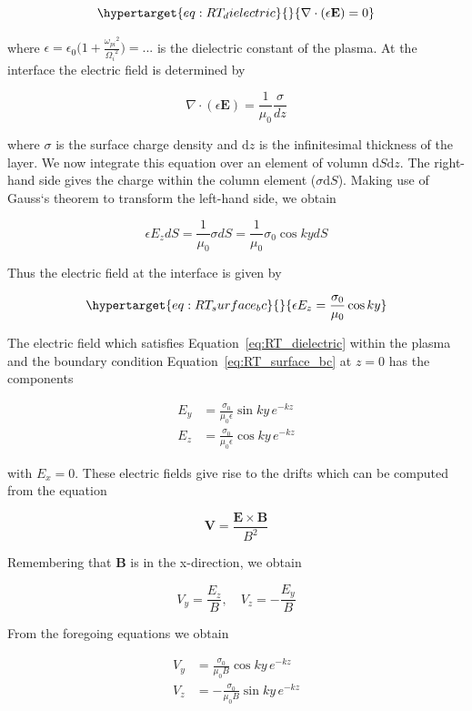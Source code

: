 \documentclass[
  notoc %
]{tufte-book}
\begin{document}
\begin{equation}\protect\hypertarget{eq:RT_dielectric}{}{
\nabla\cdot(\epsilon\mathbf{E})=0
}\label{eq:RT_dielectric}\end{equation}

where
\(\epsilon=\epsilon_0\big( 1+\frac{{\omega_{pi}}^2}{{\Omega_i}^2}\big)=...\)
is the dielectric constant of the plasma. At the interface the electric
field is determined by

\[
\nabla\cdot(\epsilon\mathbf{E})=\frac{1}{\mu_0}\frac{\sigma}{dz}
\]

where \(\sigma\) is the surface charge density and \(\mathrm{d}z\) is
the infinitesimal thickness of the layer. We now integrate this equation
over an element of volumn \(\mathrm{d}S\mathrm{d}z\). The right-hand
side gives the charge within the column element (\(\sigma\mathrm{d}S\)).
Making use of Gauss`s theorem to transform the left-hand side, we obtain

\[
\epsilon E_z dS = \frac{1}{\mu_0}\sigma dS = \frac{1}{\mu_0}\sigma_0 \cos ky dS
\]

Thus the electric field at the interface is given by

\begin{equation}\protect\hypertarget{eq:RT_surface_bc}{}{
\epsilon E_z = \frac{\sigma_0}{\mu_0}\cos ky
}\label{eq:RT_surface_bc}\end{equation}

The electric field which satisfies Equation~\ref{eq:RT_dielectric}
within the plasma and the boundary condition
Equation~\ref{eq:RT_surface_bc} at \(z=0\) has the components

\[
\begin{aligned}
E_y &= \frac{\sigma_0}{\mu_0\epsilon}\sin ky\, e^{-kz} \\
E_z &= \frac{\sigma_0}{\mu_0\epsilon}\cos ky\, e^{-kz}
\end{aligned}
\]

with \(E_x=0\). These electric fields give rise to the drifts which can
be computed from the equation

\[
\mathbf{V}=\frac{\mathbf{E}\times\mathbf{B}}{B^2}
\]

Remembering that \(\mathbf{B}\) is in the x-direction, we obtain

\[
V_y = \frac{E_z}{B},\quad V_z = -\frac{E_y}{B}
\]

From the foregoing equations we obtain

\[
\begin{aligned}
V_y &= \frac{\sigma_0}{\mu_0 B}\cos ky\, e^{-kz} \\
V_z &=-\frac{\sigma_0}{\mu_0 B}\sin ky\, e^{-kz}
\end{aligned}
\]
\end{document}
